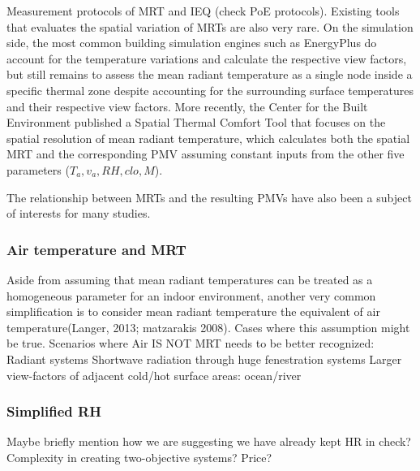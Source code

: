     Measurement protocols of MRT and IEQ (check PoE protocols).
    Existing tools that evaluates the spatial variation of MRTs are also very rare. On the simulation side, the most common building simulation engines such as EnergyPlus \cite{energyplus_engineering_2013} do account for the temperature variations and calculate the respective view factors, but still remains to assess the mean radiant temperature as a single node inside a specific thermal zone despite accounting for the surrounding surface temperatures and their respective view factors. More recently, the Center for the Built Environment published a Spatial Thermal Comfort Tool \cite{arens_modeling_2015} that focuses on the spatial resolution of mean radiant temperature, which calculates both the spatial MRT and the corresponding PMV assuming constant inputs from the other five parameters ($T_a, v_a, RH, clo, M$).  
        
    The relationship between MRTs and the resulting PMVs have also been a subject of interests for many studies. 
\subsubsection{Air temperature and MRT}
        Aside from assuming that mean radiant temperatures can be treated as a homogeneous parameter for an indoor environment, another very common simplification is to consider mean radiant temperature the equivalent of air temperature\cite{kantor_most_2011,}(Langer, 2013; matzarakis 2008). 
                Cases where this assumption might be true.
            Scenarios where Air IS NOT MRT needs to be better recognized:
            Radiant systems
            Shortwave radiation through huge fenestration systems
            Larger view-factors of adjacent cold/hot surface areas: ocean/river
\subsubsection{Simplified RH}
        Maybe briefly mention how we are suggesting we have already kept HR in check?
        Complexity in creating two-objective systems? Price?
